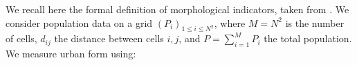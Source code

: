 



We recall here the formal definition of morphological indicators, taken from \cite{2017arXiv170806743R}. We consider population data on a grid $(P_i)_{1\leq i \leq N^2}$, where $M=N^2$ is the number of cells, $d_{ij}$ the distance between cells $i,j$, and $P=\sum_{i=1}^{M} P_i$ the total population. We measure urban form using:

